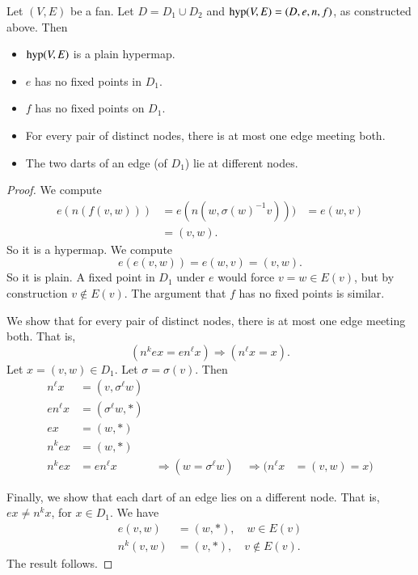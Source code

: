 \begin{lemma}
Let $(V,E)$ be a fan.  Let $D = D_1\cup D_2$
and ${\operatorname{hyp}}(V,E) = (D,e,n,f)$, as constructed above.  Then
    \begin{itemize}
    \item ${\operatorname{hyp}}(V,E)$ is a plain hypermap.
    \item  $e$ has no fixed
points in $D_1$.
    \item  $f$ has no fixed points on $D_1$.
    \item For every pair of distinct nodes, there is at most one
    edge meeting both.
    \item The two darts of an edge (of $D_1$) lie at different nodes.
    \end{itemize}
\end{lemma}

\begin{proof}  We compute
    $$
\begin{array}{lll}
e(n(f(v,w))) &= e(n(w,\sigma(w)^{-1} v))) &=
        e(w,v)\\ 
&= (v,w).
\end{array}
$$
So it is a hypermap. We compute
    $$e(e(v,w)) = e(w,v) = (v,w).$$
So it is plain. A fixed point in $D_1$ under $e$ would force $v = w\in E(v)$,
but by construction $v\not\in E(v)$.  The argument that $f$ has no
fixed points is similar.

   We show that for every pair of distinct nodes, there is at most one edge
meeting both.
That is,
        $$(n^k e x = e n^\ell x)\Rightarrow (n^\ell x = x).$$
Let $x = (v,w)\in D_1$.  Let $\sigma=\sigma(v)$. Then
    $$
    \begin{array}{lllllll}
    n^\ell x &= (v,\sigma^\ell w)\\
    e n^\ell x &= (\sigma^\ell w,*)\\
    e x &= (w,*)\\
    n^k e x &= (w,*)\\
    n^k e x &= e n^\ell x &\ \Rightarrow (w = \sigma^\ell w) &\ \Rightarrow
    (n^\ell x &= (v,w) = x)
    \end{array}
    $$

Finally, we show that each dart of an edge lies on a different node.
That is, $e x \ne n^k x$, for $x\in D_1$.  We have
    $$
    \begin{array}{lll}
        e(v,w) &= (w,*),\quad w\in E(v)\\
        n^k(v,w) &= (v,*),\quad v\not\in E(v).
    \end{array}
    $$
The result follows.
\end{proof}

